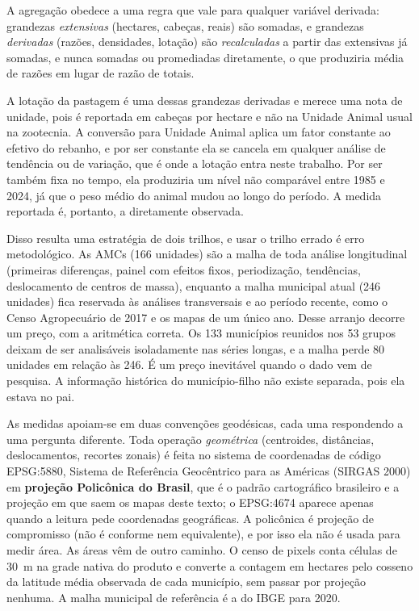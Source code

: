A agregação obedece a uma regra que vale para qualquer variável derivada:
grandezas \emph{extensivas} (hectares, cabeças, reais) são somadas, e
grandezas \emph{derivadas} (razões, densidades, lotação) são
\emph{recalculadas} a partir das extensivas já somadas, e nunca somadas ou
promediadas diretamente, o que produziria média de razões em lugar de razão
de totais.

A lotação da pastagem é uma dessas grandezas derivadas e merece uma nota de
unidade, pois é reportada em cabeças por hectare e não na Unidade Animal
usual na zootecnia. A conversão para Unidade Animal aplica um fator constante
ao efetivo do rebanho, e por ser constante ela se cancela em qualquer análise
de tendência ou de variação, que é onde a lotação entra neste trabalho. Por
ser também fixa no tempo, ela produziria um nível não comparável entre 1985 e
2024, já que o peso médio do animal mudou ao longo do período. A medida
reportada é, portanto, a diretamente observada.

Disso resulta uma estratégia de dois trilhos, e usar o trilho errado é erro
metodológico. As AMCs (166 unidades) são a malha de toda análise longitudinal
(primeiras diferenças, painel com efeitos fixos, periodização, tendências,
deslocamento de centros de massa), enquanto a malha municipal atual (246
unidades) fica reservada às análises transversais e ao período recente, como o
Censo Agropecuário de 2017 e os mapas de um único ano. Desse arranjo decorre
um preço, com a aritmética correta. Os 133 municípios reunidos nos 53 grupos
deixam de ser analisáveis isoladamente nas séries longas, e a malha perde 80
unidades em relação às 246. É um preço inevitável quando o dado vem de
pesquisa. A informação histórica do município-filho não existe separada, pois ela
estava no pai.

As medidas apoiam-se em duas convenções geodésicas, cada uma respondendo
a uma pergunta diferente. Toda operação \emph{geométrica} (centroides,
distâncias, deslocamentos, recortes zonais) é feita no sistema
de coordenadas de código EPSG:5880, Sistema de Referência Geocêntrico para as
Américas (SIRGAS 2000) em \textbf{projeção Policônica do Brasil}, que é o
padrão cartográfico brasileiro e a projeção em que saem os mapas deste texto;
o EPSG:4674 aparece apenas quando a leitura pede coordenadas geográficas. A
policônica é projeção de compromisso (não é conforme nem equivalente),
e por isso ela não é usada para medir área. As áreas vêm de outro caminho. O
censo de pixels conta células de 30~m na grade nativa do produto e converte a
contagem em hectares pelo cosseno da latitude média observada de cada
município, sem passar por projeção nenhuma. A malha municipal de referência é
a do IBGE para 2020.

